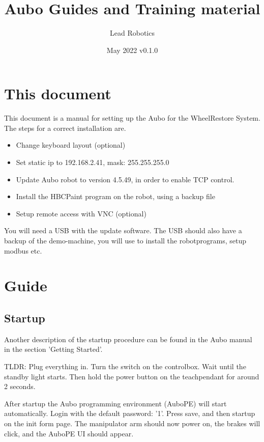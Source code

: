 \documentclass{article}
\title{Aubo Guides and Training material}
\author{Lead Robotics}
\date{May 2022 v0.1.0}
\begin{document}
\maketitle

\tableofcontents


\section{This document} 
This document is a manual for setting up the Aubo for the WheelRestore System. 
The steps for a correct installation are. 
\begin{itemize}
\item Change keyboard layout (optional)
\item Set static ip to 192.168.2.41, mask: 255.255.255.0
\item Update Aubo robot to version 4.5.49, in order to enable TCP control. 
\item Install the HBCPaint program on the robot, using a backup file
\item Setup remote access with VNC (optional)
\end{itemize}

You will need a USB with the update software. The USB should also have a backup of the demo-machine, you will use to install the robotprograms, setup modbus etc.

\section{Guide}
\subsection{Startup}
\label{subsec:Startup}
Another description of the startup procedure can be found in the Aubo manual in the section 'Getting Started'.

TLDR: Plug everything in. Turn the switch on the controlbox. Wait until the standby light starts. Then hold the power button on the teachpendant for around 2 seconds. 

After startup the Aubo programming environment (AuboPE) will start automatically. Login with the default password: '1'. Press save, and then startup on the init form page. The manipulator arm should now power on, the brakes will click, and the AuboPE UI should appear.  
\end{document}
